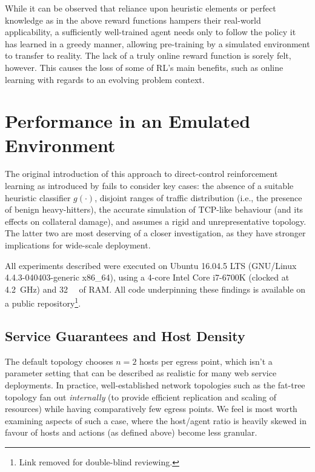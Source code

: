\documentclass[conference, letterpaper, 10pt, times]{IEEEtran}
\begin{document}
While it can be observed that reliance upon heuristic elements or perfect knowledge as in the above reward functions hampers their real-world applicability, a sufficiently well-trained agent needs only to follow the policy it has learned in a greedy manner, allowing pre-training by a simulated environment to transfer to reality.
The lack of a truly online reward function is sorely felt, however.
This causes the loss of some of RL's main benefits, such as online learning with regards to an evolving problem context.

\section{Performance in an Emulated Environment}\label{sec:performance-in-an-emulated-environment}
The original introduction of this approach to direct-control reinforcement learning as introduced by \textcite{DBLP:journals/eaai/MalialisK15} fails to consider key cases: the absence of a suitable heuristic classifier $g(\cdot)$, disjoint ranges of traffic distribution (i.e., the presence of benign heavy-hitters), the accurate simulation of TCP-like behaviour (and its effects on collateral damage), and assumes a rigid and unrepresentative topology.
The latter two are most deserving of a closer investigation, as they have stronger implications for wide-scale deployment.

All experiments described were executed on Ubuntu 16.04.5 LTS (GNU/Linux 4.4.3-040403-generic x86\_64), using a 4-core Intel Core i7-6700K (clocked at \SI{4.2}{\giga\hertz}) and \SI{32}{\gibi\byte} of RAM.
All code underpinning these findings is available on a public repository\footnote{Link removed for double-blind reviewing.}.


\subsection{Service Guarantees and Host Density}
The default topology chooses $n=2$ hosts per egress point, which isn't a parameter setting that can be described as realistic for many web service deployments.
In practice, well-established network topologies such as the fat-tree topology fan out \emph{internally} (to provide efficient replication and scaling of resources) while having comparatively few egress points.
We feel is most worth examining aspects of such a case, where the host/agent ratio is heavily skewed in favour of hosts and actions (as defined above) become less granular.
\end{document}
